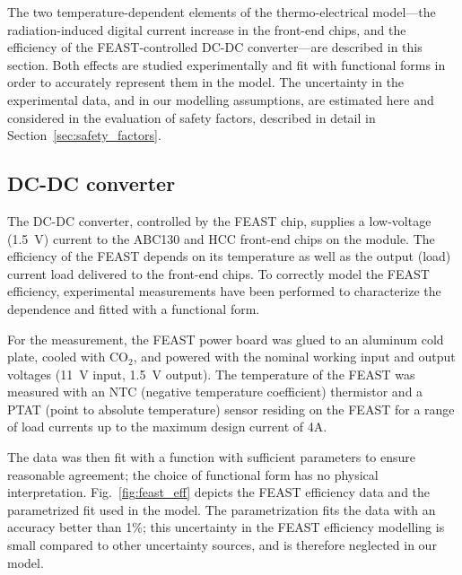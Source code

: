 
The two temperature-dependent elements of the thermo-electrical model---the
radiation-induced digital current increase in the front-end chips, and the
efficiency of the FEAST-controlled DC-DC converter---are described in this section.
Both effects are studied experimentally and fit with functional forms
in order to accurately represent them in the model.
The uncertainty in the experimental data, and in our modelling assumptions,
are estimated here and considered in the evaluation of safety factors,
described in detail in Section~\ref{sec:safety_factors}.

\subsection{DC-DC converter}

The DC-DC converter, controlled by the FEAST chip, supplies a low-voltage (1.5~V) current to the ABC130 and HCC front-end
chips on the module.
The efficiency of the FEAST depends on its temperature as well as the output (load) current
load delivered to the front-end chips. To correctly model the FEAST efficiency, experimental
measurements have been performed to characterize the dependence and fitted with a functional form.

For the measurement, the FEAST power board was glued to an aluminum cold plate, cooled
with CO$_2$, and powered with the nominal working input and output voltages (11~V input, 1.5~V output).
The temperature of the FEAST was measured with an NTC (negative temperature coefficient) thermistor and a PTAT (point to absolute temperature) sensor residing on the FEAST
for a range of load currents up to the maximum design current of 4A.

The data was then fit with a function with sufficient parameters to ensure reasonable agreement; the
choice of functional form has no physical interpretation. Fig.~\ref{fig:feast_eff} depicts the
FEAST efficiency data and the parametrized fit used in the model. The parametrization fits the data
with an accuracy better than 1\%; this uncertainty in the FEAST efficiency modelling is small
compared to other uncertainty sources, and is therefore neglected in our model.

